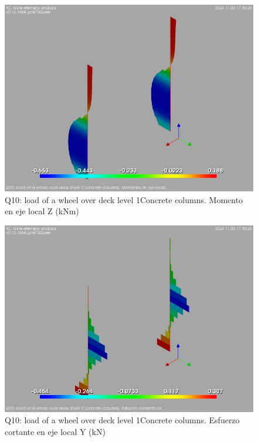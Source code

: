\begin{figure}[ht]
\begin{center}
\includegraphics[width=\linewidth]{results/graphics/resSimplLC/QwheelDeck1columnZconcrMz.png}
\caption{Q10: load of a wheel over deck level 1Concrete columns. Momento en eje local Z (kNm)}
\label{QwheelDeck1columnZconcrMz}
\end{center}
\end{figure}
\begin{figure}[ht]
\begin{center}
\includegraphics[width=\linewidth]{results/graphics/resSimplLC/QwheelDeck1columnZconcrVy.png}
\caption{Q10: load of a wheel over deck level 1Concrete columns. Esfuerzo cortante en eje local Y (kN)}
\label{QwheelDeck1columnZconcrVy}
\end{center}
\end{figure}
